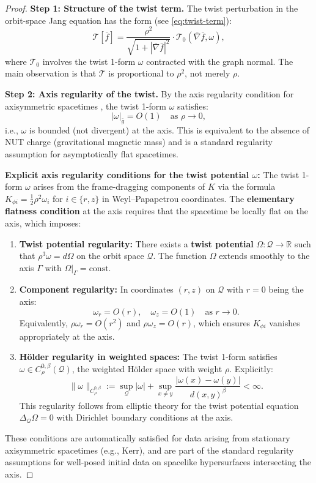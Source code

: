 \documentclass[12pt]{article}
\theoremstyle{plain}
\theoremstyle{definition}
\theoremstyle{remark}
\newcommand{\Hoelder}{\beta}
\begin{document}
\begin{proof}
\textbf{Step 1: Structure of the twist term.}
The twist perturbation in the orbit-space Jang equation has the form (see \eqref{eq:twist-term}):
\[
\mathcal{T}[\bar{f}] = \frac{\rho^2}{\sqrt{1 + |\bar{\nabla}\bar{f}|^2}} \cdot \mathcal{T}_0(\bar{\nabla}\bar{f}, \omega),
\]
where $\mathcal{T}_0$ involves the twist 1-form $\omega$ contracted with the graph normal. The main observation is that $\mathcal{T}$ is proportional to $\rho^2$, not merely $\rho$.

\textbf{Step 2: Axis regularity of the twist.}
By the axis regularity condition for axisymmetric spacetimes \cite[Chapter 7]{wald1984}, the twist 1-form $\omega$ satisfies:
\begin{equation}\label{eq:omega-axis-reg}
|\omega|_{\bar{g}} = O(1) \quad \text{as } \rho \to 0,
\end{equation}
i.e., $\omega$ is bounded (not divergent) at the axis. This is equivalent to the absence of NUT charge (gravitational magnetic mass) and is a standard regularity assumption for asymptotically flat spacetimes.

\textbf{Explicit axis regularity conditions for the twist potential $\omega$:}
The twist 1-form $\omega$ arises from the frame-dragging components of $K$ via the formula $K_{\phi i} = \frac{1}{2}\rho^2 \omega_i$ for $i \in \{r, z\}$ in Weyl--Papapetrou coordinates. The \textbf{elementary flatness condition} at the axis \cite[Section 7.1]{wald1984} requires that the spacetime be locally flat on the axis, which imposes:
\begin{enumerate}[label=\textup{(AR\arabic*)}]
    \item \textbf{Twist potential regularity:} There exists a \textbf{twist potential} $\Omega: \mathcal{Q} \to \mathbb{R}$ such that $\rho^3 \omega = d\Omega$ on the orbit space $\mathcal{Q}$. The function $\Omega$ extends smoothly to the axis $\Gamma$ with $\Omega|_\Gamma = \text{const}$.
    \item \textbf{Component regularity:} In coordinates $(r, z)$ on $\mathcal{Q}$ with $r = 0$ being the axis:
    \[
    \omega_r = O(r), \quad \omega_z = O(1) \quad \text{as } r \to 0.
    \]
    Equivalently, $\rho \omega_r = O(r^2)$ and $\rho \omega_z = O(r)$, which ensures $K_{\phi i}$ vanishes appropriately at the axis.
    \item \textbf{H\"older regularity in weighted spaces:} The twist 1-form satisfies $\omega \in C^{0,\Hoelder}_{\rho}(\mathcal{Q})$, the weighted H\"older space with weight $\rho$. Explicitly:
    \[
    \|\omega\|_{C^{0,\Hoelder}_\rho} := \sup_\mathcal{Q} |\omega| + \sup_{x \neq y} \frac{|\omega(x) - \omega(y)|}{d(x,y)^{\Hoelder}} < \infty.
    \]
    This regularity follows from elliptic theory for the twist potential equation $\Delta_\mathcal{Q}\Omega = 0$ with Dirichlet boundary conditions at the axis.
\end{enumerate}
These conditions are automatically satisfied for data arising from stationary axisymmetric spacetimes (e.g., Kerr), and are part of the standard regularity assumptions for well-posed initial data on spacelike hypersurfaces intersecting the axis.


\end{proof}
\end{document}
